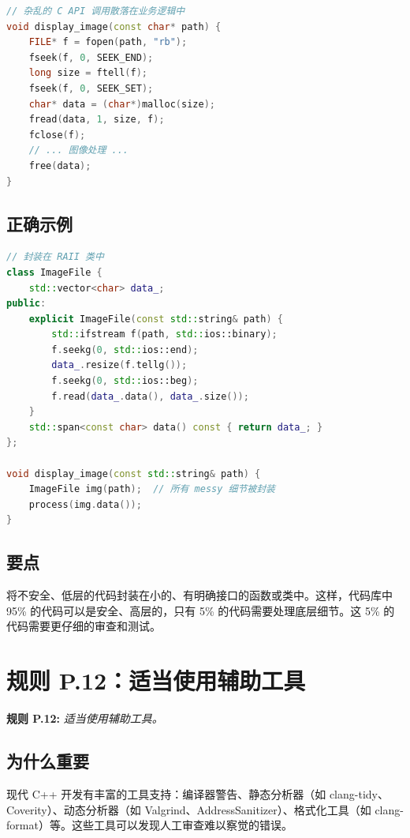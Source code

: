 \begin{lstlisting}[language=C++]
// 杂乱的 C API 调用散落在业务逻辑中
void display_image(const char* path) {
    FILE* f = fopen(path, "rb");
    fseek(f, 0, SEEK_END);
    long size = ftell(f);
    fseek(f, 0, SEEK_SET);
    char* data = (char*)malloc(size);
    fread(data, 1, size, f);
    fclose(f);
    // ... 图像处理 ...
    free(data);
}
\end{lstlisting}

\subsection{正确示例}

\begin{lstlisting}[language=C++]
// 封装在 RAII 类中
class ImageFile {
    std::vector<char> data_;
public:
    explicit ImageFile(const std::string& path) {
        std::ifstream f(path, std::ios::binary);
        f.seekg(0, std::ios::end);
        data_.resize(f.tellg());
        f.seekg(0, std::ios::beg);
        f.read(data_.data(), data_.size());
    }
    std::span<const char> data() const { return data_; }
};

void display_image(const std::string& path) {
    ImageFile img(path);  // 所有 messy 细节被封装
    process(img.data());
}
\end{lstlisting}

\subsection{要点}
将不安全、低层的代码封装在小的、有明确接口的函数或类中。这样，代码库中 95\% 的代码可以是安全、高层的，只有 5\% 的代码需要处理底层细节。这 5\% 的代码需要更仔细的审查和测试。

\section{规则 P.12：适当使用辅助工具}

\textbf{规则 P.12:} \textit{适当使用辅助工具。}

\subsection{为什么重要}

现代 C++ 开发有丰富的工具支持：编译器警告、静态分析器（如 clang-tidy、Coverity）、动态分析器（如 Valgrind、AddressSanitizer）、格式化工具（如 clang-format）等。这些工具可以发现人工审查难以察觉的错误。

